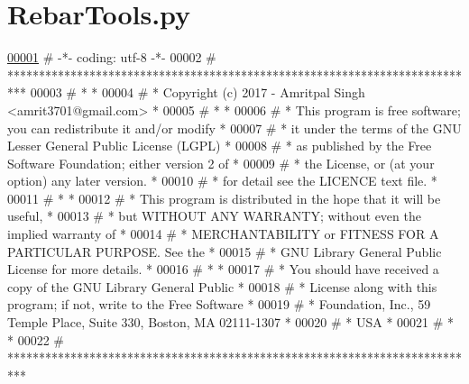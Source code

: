 \hypertarget{RebarTools_8py_source}{}\section{Rebar\+Tools.\+py}

\begin{DoxyCode}
\hypertarget{RebarTools_8py_source.tex_l00001}{}\hyperlink{namespaceRebarTools}{00001} \textcolor{comment}{# -*- coding: utf-8 -*-}
00002 \textcolor{comment}{# ***************************************************************************}
00003 \textcolor{comment}{# *                                                                         *}
00004 \textcolor{comment}{# *   Copyright (c) 2017 - Amritpal Singh <amrit3701@gmail.com>             *}
00005 \textcolor{comment}{# *                                                                         *}
00006 \textcolor{comment}{# *   This program is free software; you can redistribute it and/or modify  *}
00007 \textcolor{comment}{# *   it under the terms of the GNU Lesser General Public License (LGPL)    *}
00008 \textcolor{comment}{# *   as published by the Free Software Foundation; either version 2 of     *}
00009 \textcolor{comment}{# *   the License, or (at your option) any later version.                   *}
00010 \textcolor{comment}{# *   for detail see the LICENCE text file.                                 *}
00011 \textcolor{comment}{# *                                                                         *}
00012 \textcolor{comment}{# *   This program is distributed in the hope that it will be useful,       *}
00013 \textcolor{comment}{# *   but WITHOUT ANY WARRANTY; without even the implied warranty of        *}
00014 \textcolor{comment}{# *   MERCHANTABILITY or FITNESS FOR A PARTICULAR PURPOSE.  See the         *}
00015 \textcolor{comment}{# *   GNU Library General Public License for more details.                  *}
00016 \textcolor{comment}{# *                                                                         *}
00017 \textcolor{comment}{# *   You should have received a copy of the GNU Library General Public     *}
00018 \textcolor{comment}{# *   License along with this program; if not, write to the Free Software   *}
00019 \textcolor{comment}{# *   Foundation, Inc., 59 Temple Place, Suite 330, Boston, MA  02111-1307  *}
00020 \textcolor{comment}{# *   USA                                                                   *}
00021 \textcolor{comment}{# *                                                                         *}
00022 \textcolor{comment}{# ***************************************************************************}

\end{DoxyCode}
